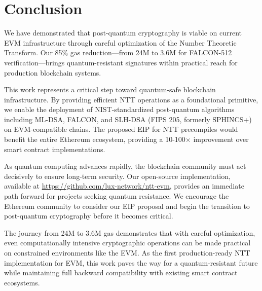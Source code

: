 \section{Conclusion}


We have demonstrated that post-quantum cryptography is viable on current EVM infrastructure through careful optimization of the Number Theoretic Transform. Our 85\% gas reduction---from 24M to 3.6M for FALCON-512 verification---brings quantum-resistant signatures within practical reach for production blockchain systems.

This work represents a critical step toward quantum-safe blockchain infrastructure. By providing efficient NTT operations as a foundational primitive, we enable the deployment of NIST-standardized post-quantum algorithms including ML-DSA, FALCON, and SLH-DSA (FIPS 205, formerly SPHINCS+) on EVM-compatible chains. The proposed EIP for NTT precompiles would benefit the entire Ethereum ecosystem, providing a 10-100$\times$ improvement over smart contract implementations.

As quantum computing advances rapidly, the blockchain community must act decisively to ensure long-term security. Our open-source implementation, available at \url{https://github.com/lux-network/ntt-evm}, provides an immediate path forward for projects seeking quantum resistance. We encourage the Ethereum community to consider our EIP proposal and begin the transition to post-quantum cryptography before it becomes critical.

The journey from 24M to 3.6M gas demonstrates that with careful optimization, even computationally intensive cryptographic operations can be made practical on constrained environments like the EVM. As the first production-ready NTT implementation for EVM, this work paves the way for a quantum-resistant future while maintaining full backward compatibility with existing smart contract ecosystems.

